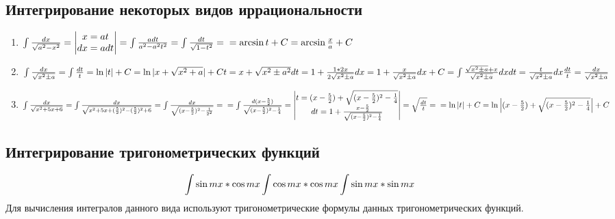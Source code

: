 \documentclass[12pt,a4paper]{article}
\begin{document}
\subsection{Интегрирование некоторых видов иррациональности}
\begin{enumerate}[leftmargin=*, itemsep=0.9ex, before={\everymath{\displaystyle}}]%
\item{
$
\int \frac{dx}{\sqrt{a^2 - x^2}} =
\begin{vmatrix} x = at \\ dx = adt \end{vmatrix} =
\int \frac{adt}{a^2 - a^2t^2} =
\int \frac{dt}{\sqrt{1 - t^2}} =\\
= \arcsin t + C = \arcsin \frac{x}{a} + C
$
}
\item{
$
\int \frac{dx}{\sqrt{x^2 \pm a}} =
\int \frac{dt}{t} = \ln |t| + C =
\ln |x + \sqrt{x^2 + a}| + C\\
t = x + \sqrt{x^2 \pm a^2}\\
dt = 1 + \frac{1 * 2x}{2 \sqrt{x^2 \pm a}} dx =
1 + \frac{x}{\sqrt{x^2 \pm a}} dx + C\\
= \int \frac{\sqrt{x^2 \pm a} + x}{\sqrt{x^2 \pm a}}dx\\
dt = \frac{t}{\sqrt{x^2 \pm a}} dx\\
\frac{dt}{t} = \frac{dx}{\sqrt{x^2 \pm a}}
$
}
\item{
$
\int \frac{dx}{\sqrt{x^2 + 5x + 6}} =
\int \frac{dx}{\sqrt{x^2 + 5x + (\frac{5}{2})^2 - (\frac{5}{2})^2 + 6}} =
\int \frac{dx}{\sqrt{(x - \frac{5}{2})^2 - \frac{1}{2^2}}} =\\
= \int \frac{d(x - \frac{5}{2})}{\sqrt{(x - \frac{5}{2})^2 - 
\frac{1}{4}}} =
\begin{vmatrix}
t = (x - \frac{5}{2}) + \sqrt{(x - \frac{5}{2})^2 - 
\frac{1}{4}}\\
dt = 1 + \frac{x - \frac{5}{2}}{\sqrt{(x - \frac{5}{2})^2
- \frac{1}{4}}}
\end{vmatrix}
= \sqrt{\frac{dt}{t}} =\\
= \ln |t| + C =
\ln \Big|(x - \frac{5}{2}) +
\sqrt{(x - \frac{5}{2})^2 - \frac{1}{4}} \Big| + C
$
}
\end{enumerate}
\subsection{Интегрирование тригонометрических функций}
\[
\int \sin mx * \cos mx\\
\int \cos mx * \cos mx\\
\int \sin mx * \sin mx
\]
Для вычисления интегралов данного вида используют тригонометрические
формулы данных тригонометрических функций.
\end{document}
